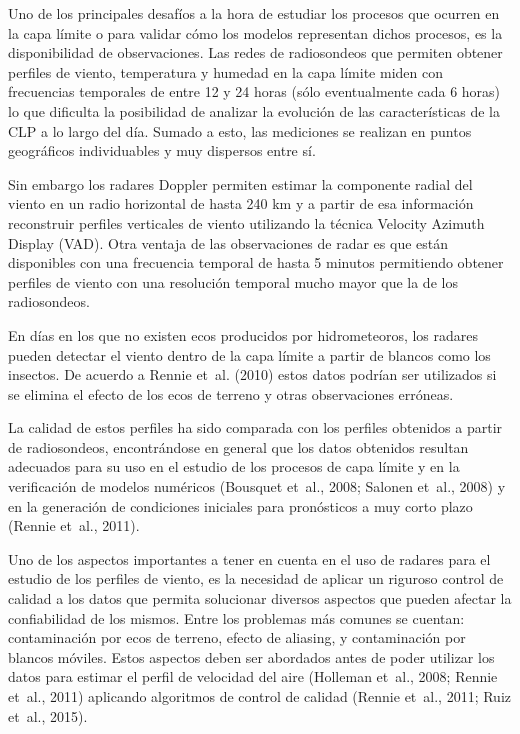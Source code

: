 \documentclass[12pt,spanish,oneside, a4paper]{book}
\begin{document}
Uno de los principales desafíos a la hora de estudiar los procesos que
ocurren en la capa límite o para validar cómo los modelos representan
dichos procesos, es la disponibilidad de observaciones. Las redes de
radiosondeos que permiten obtener perfiles de viento, temperatura y
humedad en la capa límite miden con frecuencias temporales de entre 12 y
24 horas (sólo eventualmente cada 6 horas) lo que dificulta la
posibilidad de analizar la evolución de las características de la CLP a
lo largo del día. Sumado a esto, las mediciones se realizan en puntos
geográficos individuables y muy dispersos entre sí.

Sin embargo los radares Doppler permiten estimar la componente radial
del viento en un radio horizontal de hasta 240 km y a partir de esa
información reconstruir perfiles verticales de viento utilizando la
técnica Velocity Azimuth Display (VAD). Otra ventaja de las
observaciones de radar es que están disponibles con una frecuencia
temporal de hasta 5 minutos permitiendo obtener perfiles de viento con
una resolución temporal mucho mayor que la de los radiosondeos.

En días en los que no existen ecos producidos por hidrometeoros, los
radares pueden detectar el viento dentro de la capa límite a partir de
blancos como los insectos. De acuerdo a Rennie et~al. (2010) estos datos
podrían ser utilizados si se elimina el efecto de los ecos de terreno y
otras observaciones erróneas.

La calidad de estos perfiles ha sido comparada con los perfiles
obtenidos a partir de radiosondeos, encontrándose en general que los
datos obtenidos resultan adecuados para su uso en el estudio de los
procesos de capa límite y en la verificación de modelos numéricos
(Bousquet et~al., 2008; Salonen et~al., 2008) y en la generación de
condiciones iniciales para pronósticos a muy corto plazo (Rennie et~al.,
2011).

Uno de los aspectos importantes a tener en cuenta en el uso de radares
para el estudio de los perfiles de viento, es la necesidad de aplicar un
riguroso control de calidad a los datos que permita solucionar diversos
aspectos que pueden afectar la confiabilidad de los mismos. Entre los
problemas más comunes se cuentan: contaminación por ecos de terreno,
efecto de aliasing, y contaminación por blancos móviles. Estos aspectos
deben ser abordados antes de poder utilizar los datos para estimar el
perfil de velocidad del aire (Holleman et~al., 2008; Rennie et~al.,
2011) aplicando algoritmos de control de calidad (Rennie et~al., 2011;
Ruiz et~al., 2015).
\end{document}
